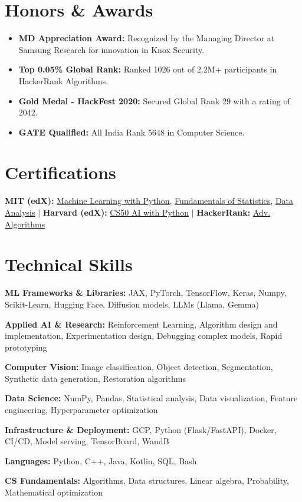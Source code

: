 \documentclass[10pt, letterpaper]{article}
\newcommand{\resumeItem}[1]{
  \item\small{
    {#1 \vspace{-2pt}}
  }
}
\newcommand{\resumeSubHeadingListStart}{\begin{itemize}[leftmargin=0.15in, label={}]}
\newcommand{\resumeSubHeadingListEnd}{\end{itemize}}
\begin{document}
\section{Honors \& Awards}
  \resumeSubHeadingListStart
    \resumeItem{\textbf{MD Appreciation Award:} Recognized by the Managing Director at Samsung Research for innovation in Knox Security.}
    \resumeItem{\textbf{Top 0.05\% Global Rank:} Ranked 1026 out of 2.2M+ participants in HackerRank Algorithms.}
    \resumeItem{\textbf{Gold Medal - HackFest 2020:} Secured Global Rank 29 with a rating of 2042.}
    \resumeItem{\textbf{GATE Qualified:} All India Rank 5648 in Computer Science.}
  \resumeSubHeadingListEnd

\section{Certifications}
  \small{
    \textbf{MIT (edX):} \href{https://courses.edx.org/certificates/bf4ea7cb34a742cea00c770801d1947d}{Machine Learning with Python}, \href{https://courses.edx.org/certificates/3c59035943454549990f2d2de7f49e9f}{Fundamentals of Statistics}, \href{https://courses.edx.org/certificates/bf4ea7cb34a742cea00c770801d1947d}{Data Analysis} $|$
    \textbf{Harvard (edX):} \href{https://cs50.harvard.edu/certificates/2b1773c1-473d-4a7b-89ae-460d23154126}{CS50 AI with Python} $|$
    \textbf{HackerRank:} \href{https://www.hackerrank.com/certificates/fc7b9af8aac8}{Adv. Algorithms}
  }

\section{Technical Skills}
 \begin{itemize}[leftmargin=0.12in, label={}]
    \small{\item{
     \textbf{ML Frameworks \& Libraries:} JAX, PyTorch, TensorFlow, Keras, Numpy, Scikit-Learn, Hugging Face, Diffusion models, LLMs (Llama, Gemma)
    }}
    \small{\item{
     \textbf{Applied AI \& Research:} Reinforcement Learning, Algorithm design and implementation, Experimentation design, Debugging complex models, Rapid prototyping
    }}
    \small{\item{
     \textbf{Computer Vision:} Image classification, Object detection, Segmentation, Synthetic data generation, Restoration algorithms
    }}
    \small{\item{
     \textbf{Data Science:} NumPy, Pandas, Statistical analysis, Data visualization, Feature engineering, Hyperparameter optimization
    }}
    \small{\item{
     \textbf{Infrastructure \& Deployment:} GCP, Python (Flask/FastAPI), Docker, CI/CD, Model serving, TensorBoard, WandB
    }}
    \small{\item{
     \textbf{Languages:} Python, C++, Java, Kotlin, SQL, Bash
    }}
    \small{\item{
     \textbf{CS Fundamentals:} Algorithms, Data structures, Linear algebra, Probability, Mathematical optimization
    }}
 \end{itemize}
\end{document}
